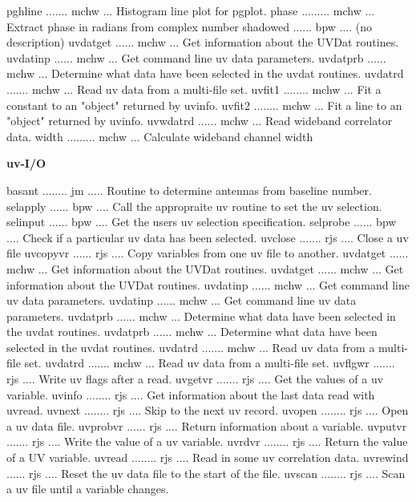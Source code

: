 {\eightpoint\begintt
pghline ....... mchw ... Histogram line plot for pgplot.
phase ......... mchw ... Extract phase in radians from complex number
shadowed ...... bpw .... (no description)
uvdatget ...... mchw ... Get information about the UVDat routines.
uvdatinp ...... mchw ... Get command line uv data parameters.
\endtt}
{\eightpoint\begintt
uvdatprb ...... mchw ... Determine what data have been selected in the uvdat routines.
uvdatrd ....... mchw ... Read uv data from a multi-file set.
uvfit1 ........ mchw ... Fit a constant to an "object" returned by uvinfo.
uvfit2 ........ mchw ... Fit a line to an "object" returned by uvinfo.
uvwdatrd ...... mchw ... Read wideband correlator data.
\endtt}
{\eightpoint\begintt
width ......... mchw ... Calculate wideband channel width
\endtt}
\par\centerline{\bf uv-I/O}
{\eightpoint\begintt
basant ........ jm ..... Routine to determine antennas from baseline number.
selapply ...... bpw .... Call the appropraite uv routine to set the uv selection.
selinput ...... bpw .... Get the users uv selection specification.
selprobe ...... bpw .... Check if a particular uv data has been selected.
uvclose ....... rjs .... Close a uv file
\endtt}
{\eightpoint\begintt
uvcopyvr ...... rjs .... Copy variables from one uv file to another.
uvdatget ...... mchw ... Get information about the UVDat routines.
uvdatget ...... mchw ... Get information about the UVDat routines.
uvdatinp ...... mchw ... Get command line uv data parameters.
uvdatinp ...... mchw ... Get command line uv data parameters.
\endtt}
{\eightpoint\begintt
uvdatprb ...... mchw ... Determine what data have been selected in the uvdat routines.
uvdatprb ...... mchw ... Determine what data have been selected in the uvdat routines.
uvdatrd ....... mchw ... Read uv data from a multi-file set.
uvdatrd ....... mchw ... Read uv data from a multi-file set.
uvflgwr ....... rjs .... Write uv flags after a read.
\endtt}
{\eightpoint\begintt
uvgetvr ....... rjs .... Get the values of a uv variable.
uvinfo ........ rjs .... Get information about the last data read with uvread.
uvnext ........ rjs .... Skip to the next uv record.
uvopen ........ rjs .... Open a uv data file.
uvprobvr ...... rjs .... Return information about a variable.
\endtt}
{\eightpoint\begintt
uvputvr ....... rjs .... Write the value of a uv variable.
uvrdvr ........ rjs .... Return the value of a UV variable.
uvread ........ rjs .... Read in some uv correlation data.
uvrewind ...... rjs .... Reset the uv data file to the start of the file.
uvscan ........ rjs .... Scan a uv file until a variable changes.
\endtt}
